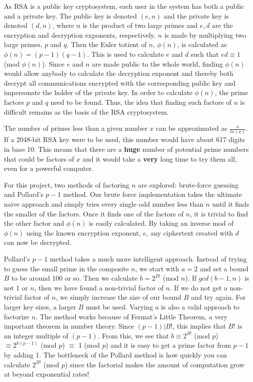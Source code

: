 \documentclass[12pt]{report}
\begin{document}
As RSA is a public key cryptosystem, each user in the system has both a public and a private key. The public key is denoted $(e,n)$ and the private key is denoted $(d,n)$, where $n$ is the product of two large primes and $e,d$ are the encryption and decryption exponents, respectively. $n$ is made by multiplying two large primes, $p$ and $q$. Then the Euler totient of $n$, $\phi(n)$, is calculated as $\phi(n) = (p-1)(q-1)$. This is used to calculate $e$ and $d$ such that $ed \equiv 1$ (mod $\phi(n)$). Since $e$ and $n$ are made public to the whole world, finding $\phi(n)$ would allow anybody to calculate the decryption exponent and thereby both decrypt all communications encrypted with the corresponding public key and impersonate the holder of the private key. In order to calculate $\phi(n)$, the prime factors $p$ and $q$ need to be found. Thus, the idea that finding such factors of $n$ is difficult remains as the basis of the RSA cryptosystem.

The number of primes less than a given number $x$ can be approximated as $\frac{x}{ln(x)}$. If a 2048-bit RSA key were to be used, this number would have about 617 digits in base 10. This means that there are a \textbf{huge} number of potential prime numbers that could be factors of $x$ and it would take a \textbf{very} long time to try them all, even for a powerful computer.

For this project, two methods of factoring $n$ are explored: brute-force guessing and Pollard's $p-1$ method.\cite{pollard} Our brute force implementation takes the ultimate naive approach and simply tries every single odd number less than $n$ until it finds the smaller of the factors. Once it finds one of the factors of $n$, it is trivial to find the other factor and $\phi(n)$ is easily calculated. By taking an inverse mod of $\phi(n)$ using the known encryption exponent, $e$, any ciphertext created with $d$ can now be decrypted.

Pollard's $p-1$ method takes a much more intelligent approach. Instead of trying to guess the small prime in the composite $n$, we start with $a=2$ and set a bound $B$ to be around 100 or so. Then we calculate $b=2^{B!}$ (mod $n$). If $gcd(b-1,n)$ is not 1 or $n$, then we have found a non-trivial factor of $n$. If we do not get a non-trivial factor of $n$, we simply increase the size of our bound $B$ and try again. For larger key sizes, a larger $B$ must be used. %
Varying $a$ is also a valid approach to factorize $n$. The method works because of Fermat's Little Theorem, a very important theorem in number theory. Since $(p-1)|B!$, this implies that $B!$ is an integer multiple of $(p-1)$. From this, we see that
$b \equiv 2^{B!}$ (mod $p$) $\equiv 2^{k(p-1)}$ (mod $p$) $\equiv$ 1 (mod $p$)
and it is easy to get a prime factor from $p-1$ by adding 1. The bottleneck of the Pollard method is how quickly you can calculate $2^{B!}$ (mod $p$) since the factorial makes the amount of computation grow at beyond exponential rates!
\end{document}
